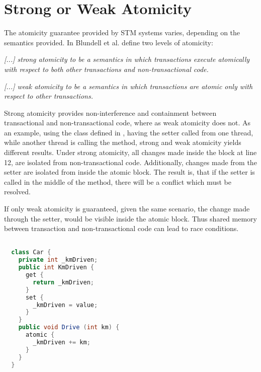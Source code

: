 


\section{Strong or Weak Atomicity}
\label{sec:design_strong_weak_atomicity}
The atomicity guarantee provided by \ac{STM} systems varies, depending on the semantics provided. In \cite{blundell2006subtleties} Blundell et al. define two levels of atomicity:
%
\begin{defn}\label{def:strong_atomicity}
\emph{[...] strong atomicity to be a semantics in which transactions execute atomically
with respect to both other transactions and non-transactional code.}
\end{defn}
%
\begin{defn}\label{def:weak_atomicity}
\emph{[...] weak atomicity to be a semantics in which transactions are atomic only with respect to other transactions.}
\end{defn}

Strong atomicity provides non-interference and containment between transactional and non-transactional code, where as weak atomicity does not. As an example, using the  class defined in , having the  setter called from one thread, while another thread is calling the  method, strong and weak atomicity yields different results. Under strong atomicity, all changes made inside the  block at line 12, are isolated from non-transactional code. Additionally, changes made from the setter are isolated from inside the atomic block. The result is, that if the setter is called in the middle of the  method, there will be a conflict which must be resolved. 

If only weak atomicity is guaranteed, given the same scenario, the change made through the setter, would be visible inside the atomic block. Thus shared memory between transaction and non-transactional code can lead to race conditions.
%

\begin{lstlisting}[label=lst:atomicity,
  caption={Level of Atomicity},
  language=Java,  
  showspaces=false,
  showtabs=false,
  breaklines=true,
  showstringspaces=false,
  breakatwhitespace=true,
  commentstyle=\color{greencomments},
  keywordstyle=\color{bluekeywords},
  stringstyle=\color{redstrings},
  morekeywords={atomic, retry, orElse, var, get, set}]  % Start your code-block

  class Car {
    private int _kmDriven;
    public int KmDriven {
      get {
        return _kmDriven;
      }
      set {
        _kmDriven = value;
      }
    }
    public void Drive (int km) {
      atomic {
        _kmDriven += km;
      }
    }
  }
\end{lstlisting}

